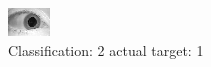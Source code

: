 \begin{figure}[h!]
\begin{center}
\includegraphics[width=0.60\columnwidth]{figures/ID1567_class_2_target_1.png}
\end{center}
\caption{ Classification: 2 actual target: 1}
\label{fig:ID1567_class_2_target_1}
\end{figure}
